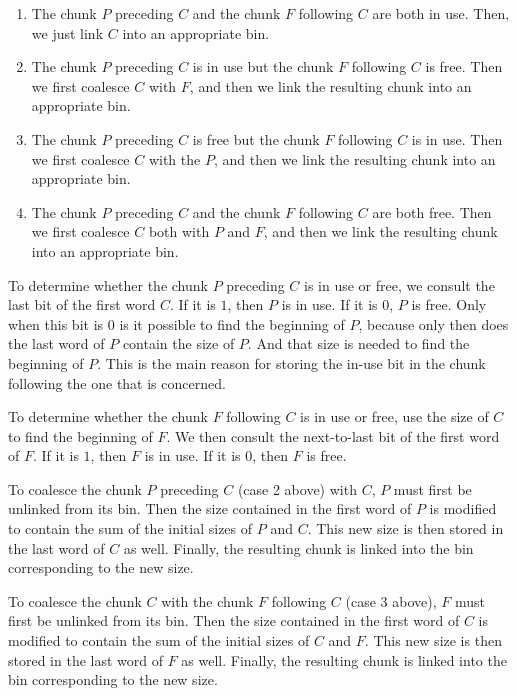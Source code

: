 \begin{enumerate}
\item The chunk $P$ preceding $C$ and the chunk $F$ following $C$
  are both in use.  Then, we just link $C$ into an appropriate
  bin.
\item The chunk $P$ preceding $C$ is in use but the chunk $F$
  following $C$ is free.  Then we first coalesce $C$ with $F$, and
  then we link the resulting chunk into an appropriate bin.
\item The chunk $P$ preceding $C$ is free but the chunk $F$ following
  $C$ is in use.  Then we first coalesce $C$ with the $P$, and then we
  link the resulting chunk into an appropriate bin.
\item The chunk $P$ preceding $C$ and the chunk $F$ following $C$ are
  both free.  Then we first coalesce $C$ both with $P$ and $F$, and
  then we link the resulting chunk into an appropriate bin.
\end{enumerate}

To determine whether the chunk $P$ preceding $C$ is in use or free, we
consult the last bit of the first word $C$.  If it is $1$, then
$P$ is in use.  If it is $0$, $P$ is free.  Only when this bit is $0$ is
it possible to find the beginning of $P$, because only then does the
last word of $P$ contain the size of $P$.  And that size is needed to
find the beginning of $P$.  This is the main reason for storing the
in-use bit in the chunk following the one that is concerned.

To determine whether the chunk $F$ following $C$ is in use or free,
use the size of $C$ to find the beginning of $F$.  We then consult the
next-to-last bit of the first word of $F$.  If it is $1$, then $F$ is
in use.  If it is $0$, then $F$ is free.

To coalesce the chunk $P$ preceding $C$ (case 2 above) with $C$, $P$
must first be unlinked from its bin.  Then the size contained in the
first word of $P$ is modified to contain the sum of the initial sizes
of $P$ and $C$.  This new size is then stored in the last word of $C$
as well.  Finally, the resulting chunk is linked into the bin
corresponding to the new size.

To coalesce the chunk $C$ with the chunk $F$ following $C$ (case 3
above), $F$ must first be unlinked from its bin.  Then the size
contained in the first word of $C$ is modified to contain the sum of
the initial sizes of $C$ and $F$.  This new size is then stored in the
last word of $F$ as well.  Finally, the resulting chunk is linked into
the bin corresponding to the new size.

